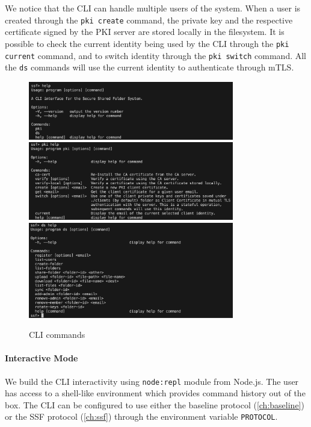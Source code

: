 We notice that the CLI can handle multiple users of
the system. When a user is created through the
\texttt{pki create} command, the private key and
the respective certificate signed by the PKI server
are stored locally in the filesystem.
It is possible to check the current identity being
used by the CLI through the \texttt{pki current} command,
and to switch identity through the \texttt{pki switch} command.
All the \texttt{ds} commands
will use the current identity to authenticate 
through mTLS.

\begin{figure}
    \centering
    \includegraphics[width=0.8\textwidth]{figures/climain.png}
    \includegraphics[width=0.8\textwidth]{figures/pkimain.png}
    \includegraphics[width=0.8\textwidth]{figures/dsmain.png}
    \caption{CLI commands}
    \label{fig:climain}
\end{figure}


\paragraph{Interactive Mode}
We build the CLI interactivity using
\texttt{node:repl} module from Node.js.
The user has access to a shell-like environment
which provides command history out of the box.
The CLI can be configured to use either the
baseline protocol (\cref{ch:baseline}) or the
SSF protocol (\cref{ch:ssf}) through the environment
variable \texttt{PROTOCOL}.

